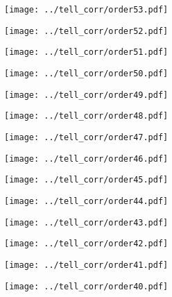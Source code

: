 \documentclass{article}
\begin{document}
\begin{figure}[H]
    \centering
    \texttt{[image: ../tell\_corr/order53.pdf]}
\end{figure}
\begin{figure}[H]
    \centering
    \texttt{[image: ../tell\_corr/order52.pdf]}
\end{figure}
\begin{figure}[H]
    \centering
    \texttt{[image: ../tell\_corr/order51.pdf]}
\end{figure}
\begin{figure}[H]
    \centering
    \texttt{[image: ../tell\_corr/order50.pdf]}
\end{figure}
\begin{figure}[H]
    \centering
    \texttt{[image: ../tell\_corr/order49.pdf]}
\end{figure}
\begin{figure}[H]
    \centering
    \texttt{[image: ../tell\_corr/order48.pdf]}
\end{figure}
\begin{figure}[H]
    \centering
    \texttt{[image: ../tell\_corr/order47.pdf]}
\end{figure}
\begin{figure}[H]
    \centering
    \texttt{[image: ../tell\_corr/order46.pdf]}
\end{figure}
\begin{figure}[H]
    \centering
    \texttt{[image: ../tell\_corr/order45.pdf]}
\end{figure}
\begin{figure}[H]
    \centering
    \texttt{[image: ../tell\_corr/order44.pdf]}
\end{figure}
\begin{figure}[H]
    \centering
    \texttt{[image: ../tell\_corr/order43.pdf]}
\end{figure}
\begin{figure}[H]
    \centering
    \texttt{[image: ../tell\_corr/order42.pdf]}
\end{figure}
\begin{figure}[H]
    \centering
    \texttt{[image: ../tell\_corr/order41.pdf]}
\end{figure}
\begin{figure}[H]
    \centering
    \texttt{[image: ../tell\_corr/order40.pdf]}
\end{figure}
\end{document}
